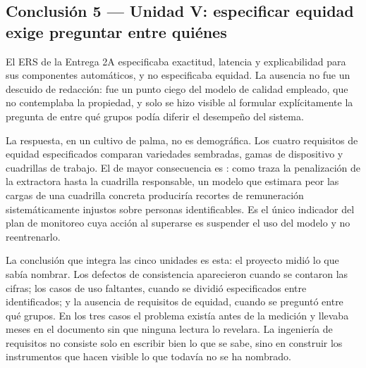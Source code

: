 \subsection*{Conclusión 5 --- Unidad V: especificar equidad exige preguntar entre quiénes}

El ERS de la Entrega 2A especificaba exactitud, latencia y explicabilidad para sus componentes
automáticos, y no especificaba equidad. La ausencia no fue un descuido de redacción: fue un punto
ciego del modelo de calidad empleado, que no contemplaba la propiedad, y solo se hizo visible al
formular explícitamente la pregunta de entre qué grupos podía diferir el desempeño del sistema.

La respuesta, en un cultivo de palma, no es demográfica. Los cuatro requisitos de equidad
especificados comparan variedades sembradas, gamas de dispositivo y cuadrillas de trabajo. El de
mayor consecuencia es : como  traza la penalización de la extractora hasta la
cuadrilla responsable, un modelo que estimara peor las cargas de una cuadrilla concreta produciría
recortes de remuneración sistemáticamente injustos sobre personas identificables. Es el único
indicador del plan de monitoreo cuya acción al superarse es suspender el uso del modelo y no
reentrenarlo.

La conclusión que integra las cinco unidades es esta: el proyecto midió lo que sabía nombrar. Los
defectos de consistencia aparecieron cuando se contaron las cifras; los casos de uso faltantes,
cuando se dividió especificados entre identificados; y la ausencia de requisitos de equidad, cuando
se preguntó entre qué grupos. En los tres casos el problema existía antes de la medición y llevaba
meses en el documento sin que ninguna lectura lo revelara. La ingeniería de requisitos no consiste
solo en escribir bien lo que se sabe, sino en construir los instrumentos que hacen visible lo que
todavía no se ha nombrado.
